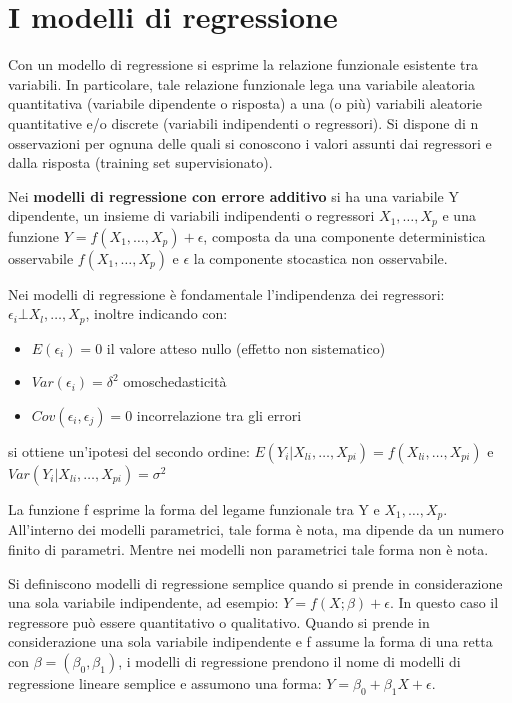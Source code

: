 \documentclass[a4paper]{extarticle}
\begin{document}
\newpage

\section{I modelli di regressione}

Con un modello di regressione si esprime la relazione funzionale esistente tra variabili.
In particolare, tale relazione funzionale lega una variabile aleatoria quantitativa (variabile dipendente o risposta) a una (o più) variabili aleatorie quantitative e/o discrete (variabili indipendenti o regressori). Si dispone di n osservazioni per ognuna delle quali si conoscono i valori assunti dai regressori e dalla risposta (training set supervisionato).

Nei \textbf{modelli di regressione con errore additivo} si ha una variabile Y dipendente, un insieme di variabili indipendenti o regressori $X_1,\dots,X_p$ e una funzione $Y = f(X_1,\dots,X_p)+\epsilon$, composta da una componente deterministica osservabile $f(X_1,\dots,X_p)$ e $\epsilon$ la componente stocastica non osservabile. 

Nei modelli di regressione è fondamentale l'indipendenza dei regressori: $\epsilon_i \bot X_l,\dots,X_p$, inoltre indicando con:
\begin{itemize}
\item $E(\epsilon_i) = 0$ il valore atteso nullo (effetto non sistematico)
\item $Var(\epsilon_i) = \delta^2$ omoschedasticità
\item $Cov(\epsilon_i,\epsilon_j)=0$ incorrelazione tra gli errori
\end{itemize}

si ottiene un'ipotesi del secondo ordine: $E(Y_i | X_{li}, \dots, X_{pi}) = f(X_{li},\dots,X_{pi})$ e $Var(Y_i |  X_{li}, \dots, X_{pi}) = \sigma^2$

La funzione f esprime la forma del legame funzionale tra Y e $X_1,\dots,X_p$. All'interno dei modelli parametrici, tale forma è nota, ma dipende da un numero finito di parametri. Mentre nei modelli non parametrici tale forma non è nota.

Si definiscono modelli di regressione semplice quando si prende in considerazione una sola variabile indipendente, ad esempio: $ Y = f(X; \beta) +\epsilon$. In questo caso il regressore può essere quantitativo o qualitativo. Quando si prende in considerazione una sola variabile indipendente e f assume la forma di una retta con $\beta = (\beta_0,\beta_1)$, i modelli di regressione prendono il nome di modelli di regressione lineare semplice e assumono una forma: $Y = \beta_0 + \beta_1 X + \epsilon$.
\end{document}
